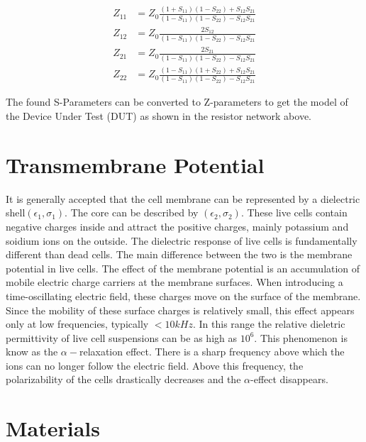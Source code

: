 \documentclass[journal]{IEEEtran}
\begin{document}
\begin{align*}
\label{s-conversion-z}
Z_{11} &= Z_0\frac{(1+S_{11})(1-S_{22})+S_{12}S_{21}}{ (1-S_{11})(1-S_{22})-S_{12}S_{21}} \\
Z_{12} &= Z_0\frac{2S_{12}}{ (1-S_{11})(1-S_{22})-S_{12}S_{21}} \\
Z_{21} &= Z_0\frac{2S_{21}}{ (1-S_{11})(1-S_{22})-S_{12}S_{21}} \\
Z_{22} &= Z_0\frac{ (1-S_{11})(1+S_{22})+S_{12}S_{21}}{ (1-S_{11})(1-S_{22})-S_{12}S_{21}}
\end{align*}

The found S-Parameters can be converted to Z-parameters to get the model of the Device Under Test (DUT) as shown in the resistor network above.

\section{Transmembrane Potential}
It is generally accepted that the cell membrane can be represented by a dielectric shell$(\epsilon_1,\sigma_1)$. The core can be described by $(\epsilon_2,\sigma_2)$. These live cells contain negative charges inside and attract the positive charges, mainly potassium and soidium ions on the outside. The dielectric response of live cells is fundamentally different than dead cells. The main difference between the two is the membrane potential in live cells. The effect of the membrane potential is an accumulation of mobile electric charge carriers at the membrane surfaces. When introducing a time-oscillating electric field, these charges move on the surface of the membrane. Since the mobility of these surface charges is relatively small, this effect appears only at low frequencies, typically $<10kHz$. In this range the relative dieletric permittivity of live cell suspensions can be as high as $10^6$. This phenomenon is know as the $\alpha-$relaxation effect\cite{dielectric-response}. There is a sharp frequency above which the ions can no longer follow the electric field. Above this frequency, the polarizability of the cells drastically decreases and the $\alpha$-effect disappears.

\section{Materials}
\end{document}
